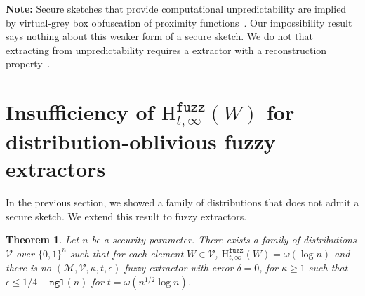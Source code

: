 \documentclass[11pt]{article}
\newcommand{\class}[1]{{\ensuremath{\mathsf{#1}}}}
\newcommand{\sketch}{\ensuremath{\class{SS}}\xspace}
\newcommand{\rec}{\ensuremath{\class{Rec}}\xspace}
\newcommand{\zo}{\ensuremath{\{0, 1\}}}
\newcommand{\ngl}{\ensuremath{\mathtt{ngl}}\xspace}
\newcommand{\Hfuzz}{\mathrm{H}^{\mathtt{fuzz}}_{t,\infty}}
\newtheorem{theorem}{Theorem}[section]
\newtheorem{corollary}[theorem]{Corollary}
\begin{document}

\textbf{Note:} Secure sketches that provide computational unpredictability are implied by virtual-grey box obfuscation of proximity functions~\cite{BitanskyCKP14}.  Our impossibility result says nothing about this weaker form of a secure sketch.  We do not that extracting from unpredictability requires a extractor with a reconstruction property~\cite{barak-computational, DBLP:conf/eurocrypt/HsiaoLR07}.

\section{Insufficiency of $\Hfuzz(W)$ for distribution-oblivious fuzzy extractors}
\label{sec:imposs fuzz ext}
In the previous section, we showed a family of distributions that does not admit a secure sketch.  We extend this result to fuzzy extractors.  

\begin{theorem}
\label{thm:imposs fuzz ext}
Let $n$ be a security parameter.  There exists a family of distributions $\mathcal{V}$ over $\zo^n$ such that for each element $W\in \mathcal{V}$, $\Hfuzz(W)= \omega(\log n)$ and there is no $(\mathcal{M}, \mathcal{V}, \kappa, t, \epsilon)$-fuzzy extractor with error $\delta = 0$, for $\kappa \ge 1$ such that $\epsilon \le 1/4 - \ngl(n)$ for $t = \omega(n^{1/2}\log n)$. \end{theorem}
\end{document}
